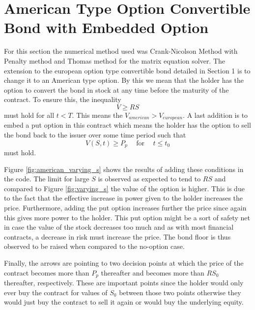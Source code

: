 \documentclass{article}
\begin{document}
\section{American Type Option Convertible Bond with Embedded Option}
For this section the numerical method used was Crank-Nicolson Method with Penalty method and Thomas method for the matrix equation solver.
The extension to the european option type convertible bond detailed in Section 1 is to change it to an American type option.
By this we mean that the holder has the option to convert the bond in stock at any time before the maturity of the contract.
To ensure this, the inequality
\begin{equation}
  V \geq RS
  \label{eq:inequality}
\end{equation}
must hold for all $t<T$.
This means the $V_{american}>V_{european}$.
A last addition is to embed a put option in this contract which means the holder has the option to sell the bond back to the issuer over some time period such that
\begin{equation}
  V(S,t) \geq P_p \hspace{15pt} \text{for} \hspace{15pt} t \leq t_0
  \label{eq:inequality_2}
\end{equation}
must hold.
\\
\par Figure \ref{fig:american_varying_s} shows the results of adding these conditions in the code.
The limit for large $S$ is observed as expected to tend to $RS$ and compared to Figure \ref{fig:varying_s} the value of the option is higher.
This is due to the fact that the effective increase in power given to the holder increases the price.
Furthermore, adding the put option increases further the price since again this gives more power to the holder.
This put option might be a sort of safety net in case the value of the stock decreases too much and as with most financial contracts, a decrease in risk must increase the price.
The bond floor is thus observed to be raised when compared to the no-option case.
\\
\par Finally, the arrows are pointing to two decision points at which the price of the contract becomes more than $P_p$ thereafter and becomes more than $RS_0$ thereafter, respectively.
These are important points since the holder would only ever buy the contract for values of $S_0$ between those two points otherwise they would just buy the contract to sell it again or would buy the underlying equity.
\end{document}
